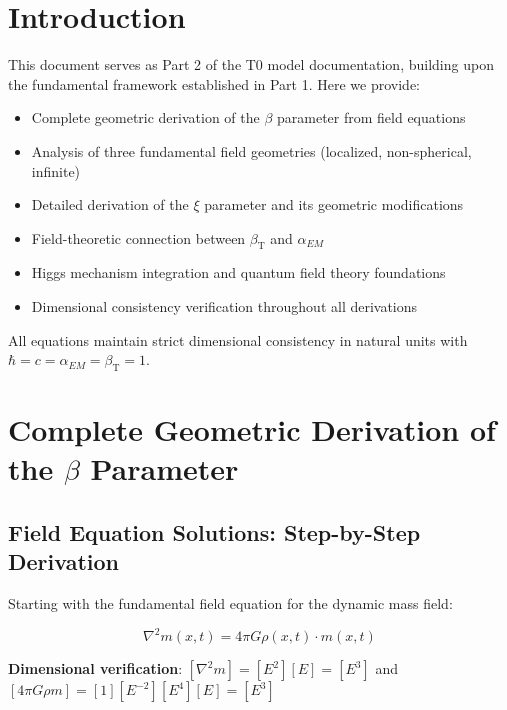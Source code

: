 \documentclass[12pt,a4paper]{article}
\newcommand{\betaT}{\beta_{\text{T}}}
\begin{document}
		\section{Introduction}
	\label{sec:introduction}
	
	This document serves as Part 2 of the T0 model documentation, building upon the fundamental framework established in Part 1. Here we provide:
	
	\begin{itemize}
		\item Complete geometric derivation of the $\beta$ parameter from field equations
		\item Analysis of three fundamental field geometries (localized, non-spherical, infinite)
		\item Detailed derivation of the $\xi$ parameter and its geometric modifications
		\item Field-theoretic connection between $\betaT$ and $\alpha_{EM}$
		\item Higgs mechanism integration and quantum field theory foundations
		\item Dimensional consistency verification throughout all derivations
	\end{itemize}
	
	All equations maintain strict dimensional consistency in natural units with $\hbar = c = \alpha_{EM} = \betaT = 1$.
	
	\section{Complete Geometric Derivation of the $\beta$ Parameter}
	\label{sec:complete_beta_derivation}
	
	\subsection{Field Equation Solutions: Step-by-Step Derivation}
	\label{subsec:field_solutions}
	
	Starting with the fundamental field equation for the dynamic mass field:
	
	\begin{equation}
		\label{eq:fundamental_field_equation}
		\nabla^2 m(x,t) = 4\pi G \rho(x,t) \cdot m(x,t)
	\end{equation}
	
	\textbf{Dimensional verification}: $[\nabla^2 m] = [E^2][E] = [E^3]$ and $[4\pi G \rho m] = [1][E^{-2}][E^4][E] = [E^3]$ \checkmark
	
\end{document}
